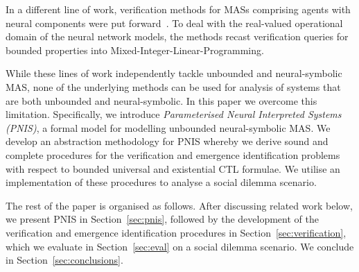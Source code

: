 In a different line of work, verification methods for MASs comprising agents
with neural components were put forward~\cite{Akintunde+20b,Akintunde+22}. To
deal with the real-valued operational domain of the neural network models, the
methods recast verification queries for bounded properties into
Mixed-Integer-Linear-Programming.

While these lines of work independently tackle unbounded and neural-symbolic
MAS, none of the underlying methods can be used for analysis of systems that are
both unbounded and neural-symbolic.  In this paper we overcome this limitation.
Specifically, we introduce \emph{Parameterised Neural Interpreted Systems (PNIS)}, a
formal model
for modelling unbounded neural-symbolic MAS.  We develop an abstraction
methodology for PNIS whereby we derive sound and complete procedures for the
verification and emergence identification problems with respect to bounded
universal and existential CTL formulae.  We utilise an implementation of these
procedures to  analyse a 
social dilemma scenario.




The rest of the paper is organised as follows. After discussing related work
below, we present PNIS in Section~\ref{sec:pnis}, followed by the development of
the verification and emergence identification procedures in
Section~\ref{sec:verification}, which we evaluate in Section~\ref{sec:eval}  on
a social dilemma scenario. We conclude in Section~\ref{sec:conclusions}.


